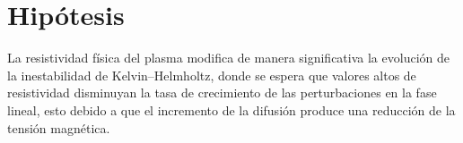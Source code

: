 \section{Hipótesis}  

La resistividad física del plasma modifica de manera significativa la evolución de la inestabilidad de Kelvin–Helmholtz, donde se espera que valores altos de resistividad disminuyan la tasa de crecimiento de las perturbaciones en la fase lineal, esto debido a que el incremento de la difusión produce una reducción de la tensión magnética.
